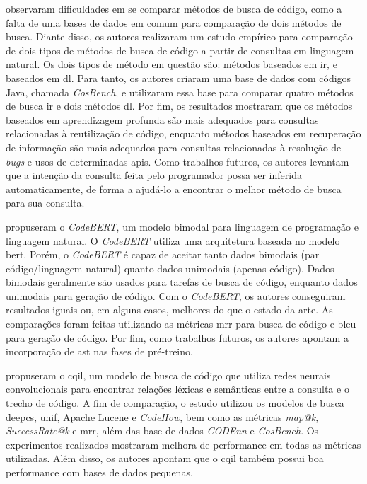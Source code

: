 \textcite{Yan2020AreTC} observaram dificuldades em se comparar métodos de busca de código, como a falta de uma bases de dados em comum para comparação de dois métodos de busca. Diante disso, os autores realizaram um estudo empírico para comparação de dois tipos de métodos de busca de código a partir de consultas em linguagem natural. Os dois tipos de método em questão são: métodos baseados em \gls{ir}, e baseados em \gls{dl}. Para tanto, os autores criaram uma base de dados com códigos Java, chamada \textit{CosBench}, e utilizaram essa base para comparar quatro métodos de busca \gls{ir} e dois métodos \gls{dl}. Por fim, os resultados mostraram que os métodos baseados em aprendizagem profunda são mais adequados para consultas relacionadas à reutilização de código, enquanto métodos baseados em recuperação de informação são mais adequados para consultas relacionadas à resolução de \emph{bugs} e usos de determinadas \glspl{api}. Como trabalhos futuros, os autores levantam que a intenção da consulta feita pelo programador possa ser inferida automaticamente, de forma a ajudá-lo a encontrar o melhor método de busca para sua consulta.

\textcite{Feng2020CodeBERTAP} propuseram o \textit{CodeBERT}, um modelo bimodal para linguagem de programação e linguagem natural. O \textit{CodeBERT} utiliza uma arquitetura baseada no modelo \gls{bert}. Porém, o \textit{CodeBERT} é capaz de aceitar tanto dados bimodais (par código/linguagem natural) quanto dados unimodais (apenas código). Dados bimodais geralmente são usados para tarefas de busca de código, enquanto dados unimodais para geração de código. Com o \textit{CodeBERT}, os autores conseguiram resultados iguais ou, em alguns casos, melhores do que o estado da arte. As comparações foram feitas utilizando as métricas \gls{mrr} para busca de código e \gls{bleu} para geração de código. Por fim, como trabalhos futuros, os autores apontam a incorporação de \gls{ast} nas fases de pré-treino.

\textcite{Li2020LearningCI} propuseram o \gls{cqil}, um modelo de busca de código que utiliza redes neurais convolucionais para encontrar relações léxicas e semânticas entre a consulta e o trecho de código. A fim de comparação, o estudo utilizou os modelos de busca \gls{deepcs}, \gls{unif}, Apache Lucene e \textit{CodeHow}, bem como as métricas \textit{map@k}, \textit{SuccessRate@k} e \gls{mrr}, além das base de dados \textit{CODEnn} e \textit{CosBench}. Os experimentos realizados mostraram melhora de performance em todas as métricas utilizadas. Além disso, os autores apontam que o \gls{cqil} também possui boa performance com bases de dados pequenas.

